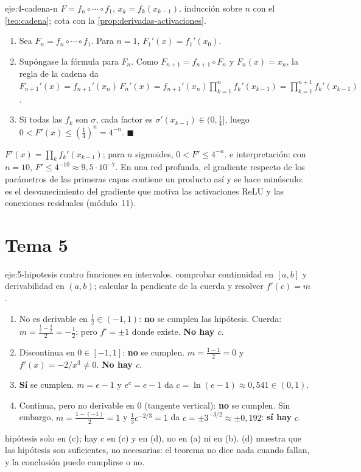 \begin{solucion}{eje:4-cadena-n}
\datos $F=f_n\circ\cdots\circ f_1$, $x_k=f_k(x_{k-1})$.
\planteamiento inducción sobre $n$ con el \cref{teo:cadena}; cota con la \cref{prop:derivadas-activaciones}.
\pasos
\begin{enumerate}[label=\arabic*.]
  \item Sea $F_n=f_n\circ\cdots\circ f_1$. Para $n=1$, $F_1'(x)=f_1'(x_0)$.
  \item Supóngase la fórmula para $F_n$. Como $F_{n+1}=f_{n+1}\circ F_n$ y $F_n(x)=x_n$, la regla de la cadena da $F_{n+1}'(x)=f_{n+1}'(x_n)\,F_n'(x)=f_{n+1}'(x_n)\prod_{k=1}^{n}f_k'(x_{k-1})=\prod_{k=1}^{n+1}f_k'(x_{k-1})$.
  \item Si todas las $f_k$ son $\sigma$, cada factor es $\sigma'(x_{k-1})\in(0,\frac14]$, luego $0<F'(x)\le(\frac14)^{n}=4^{-n}$. \hfill$\blacksquare$
\end{enumerate}
\resultado $F'(x)=\prod_kf_k'(x_{k-1})$; para $n$ sigmoides, $0<F'\le4^{-n}$.
\comprobacion e interpretación: con $n=10$, $F'\le4^{-10}\approx9{,}5\cdot10^{-7}$. En una red profunda, el gradiente respecto de los parámetros de las primeras capas contiene un producto así y se hace minúsculo: es el desvanecimiento del gradiente que motiva las activaciones ReLU y las conexiones residuales (módulo~11).
\end{solucion}
\section{Tema 5}

\begin{solucion}{eje:5-hipotesis}
\datos cuatro funciones en intervalos.
\planteamiento comprobar continuidad en $[a,b]$ y derivabilidad en $(a,b)$; calcular la pendiente de la cuerda y resolver $f'(c)=m$.
\pasos
\begin{enumerate}[label=(\alph*)]
  \item No es derivable en $\frac12\in(-1,1)$: \textbf{no} se cumplen las hipótesis. Cuerda: $m=\frac{\frac12-\frac32}{2}=-\frac12$; pero $f'=\pm1$ donde existe. \textbf{No hay $c$}.
  \item Discontinua en $0\in[-1,1]$: \textbf{no} se cumplen. $m=\frac{1-1}{2}=0$ y $f'(x)=-2/x^{3}\ne0$. \textbf{No hay $c$}.
  \item \textbf{Sí} se cumplen. $m=e-1$ y $e^{c}=e-1$ da $c=\ln(e-1)\approx0{,}541\in(0,1)$.
  \item Continua, pero no derivable en $0$ (tangente vertical): \textbf{no} se cumplen. Sin embargo, $m=\frac{1-(-1)}{2}=1$ y $\frac13c^{-2/3}=1$ da $c=\pm3^{-3/2}\approx\pm0{,}192$: \textbf{sí hay} $c$.
\end{enumerate}
\resultado hipótesis solo en (c); hay $c$ en (c) y en (d), no en (a) ni en (b).
\comprobacion (d) muestra que las hipótesis son suficientes, no necesarias: el teorema no dice nada cuando fallan, y la conclusión puede cumplirse o no.
\end{solucion}

